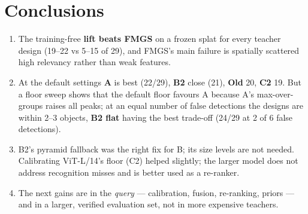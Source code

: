\documentclass[11pt,a4paper]{article}
\begin{document}
\section{Conclusions}
\begin{enumerate}
  \item The training-free \textbf{lift beats FMGS} on a frozen splat for every teacher design (19--22 vs 5--15 of 29),
        and FMGS's main failure is spatially scattered high relevancy rather than weak features.
  \item At the default settings \textbf{A} is best (22/29), \textbf{B2} close (21), \textbf{Old} 20, \textbf{C2} 19. But a
        floor sweep shows that the default floor favours A because A's max-over-groups raises all peaks; at an equal
        number of false detections the designs are within 2--3 objects, \textbf{B2 flat} having the best trade-off (24/29 at
        2 of 6 false detections).
  \item B2's pyramid fallback was the right fix for B; its size levels are not needed. Calibrating ViT-L/14's floor (C2)
        helped slightly; the larger model does not address recognition misses and is better used as a re-ranker.
  \item The next gains are in the \emph{query} --- calibration, fusion, re-ranking, priors --- and in a larger, verified
        evaluation set, not in more expensive teachers.
\end{enumerate}

\appendix
\end{document}
